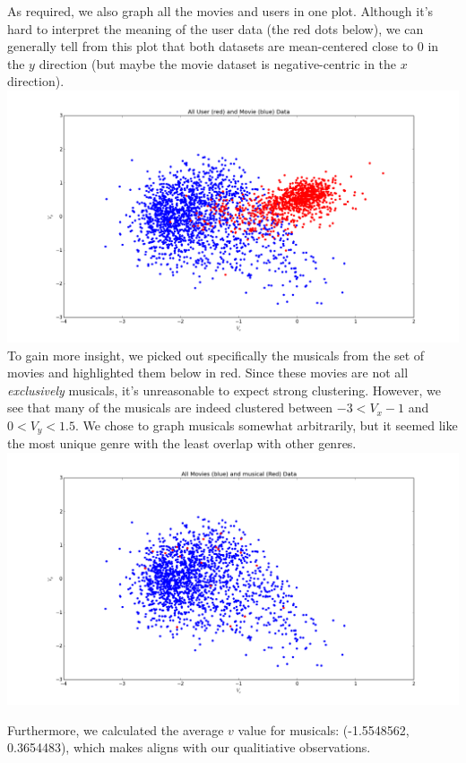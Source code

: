 \documentclass{article}
\begin{document}
As required, we also graph all the movies and users in one plot. Although
it's hard to interpret the meaning of the user data (the red dots below),
we can generally tell from this plot that both datasets are mean-centered
close to 0 in the $y$ direction (but maybe the movie dataset is negative-centric
in the $x$ direction). \\
\includegraphics[width=1\textwidth]{all_users_movies}
To gain more insight, we picked out specifically the musicals from the set of movies
and highlighted them below in red. Since these movies are not all \textit{exclusively}
musicals, it's unreasonable to expect strong clustering. However, we see that
many of the musicals are indeed clustered between $-3 < V_x -1 $ and $0 < V_y < 1.5$.
We chose to graph musicals somewhat arbitrarily, but it seemed like the most
unique genre with the least overlap with other genres.
\includegraphics[width=1\textwidth]{musical_all_movies}

Furthermore, we calculated the average $v$ value for musicals: (-1.5548562, 0.3654483),
which makes aligns with our qualitiative observations.
\end{document}
